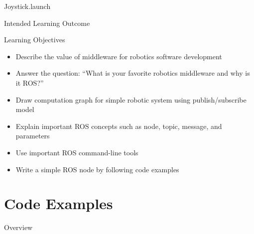 \documentclass[aspectratio=43]{beamer}
\begin{document}
\begin{frame}{Joystick.launch}
\end{frame}

\begin{frame}{Intended Learning Outcome}
	\begin{block}{Learning Objectives}
		\begin{itemize}
			\item<0> Describe the value of middleware for robotics software development
			\item<0> Answer the question: ``What is your favorite robotics middleware and why is it ROS?''
			\item<0> Draw computation graph for simple robotic system using publish/subscribe model
			\item<1> Explain important ROS concepts such as node, topic, message, and parameters
			\item<1> Use important ROS command-line tools
			\item<0> Write a simple ROS node by following code examples
		\end{itemize}
	\end{block}
\end{frame}

\section{Code Examples}
\begin{frame}[label=overview]{Overview}
	\tableofcontents[sectionstyle=show/shaded,subsectionstyle=show/shaded/shaded]
\end{frame}
\end{document}
